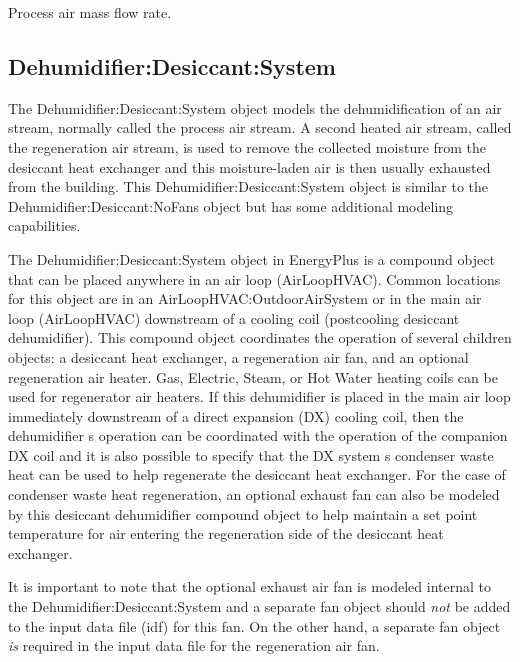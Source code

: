Process air mass flow rate.

\subsection{Dehumidifier:Desiccant:System}\label{dehumidifierdesiccantsystem}

The Dehumidifier:Desiccant:System object models the dehumidification of an air stream, normally called the process air stream. A second heated air stream, called the regeneration air stream, is used to remove the collected moisture from the desiccant heat exchanger and this moisture-laden air is then usually exhausted from the building. This Dehumidifier:Desiccant:System object is similar to the Dehumidifier:Desiccant:NoFans object but has some additional modeling capabilities.

The Dehumidifier:Desiccant:System object in EnergyPlus is a compound object that can be placed anywhere in an air loop (AirLoopHVAC). Common locations for this object are in an AirLoopHVAC:OutdoorAirSystem or in the main air loop (AirLoopHVAC) downstream of a cooling coil (postcooling desiccant dehumidifier). This compound object coordinates the operation of several children objects: a desiccant heat exchanger, a regeneration air fan, and an optional regeneration air heater. Gas, Electric, Steam, or Hot Water heating coils can be used for regenerator air heaters. If this dehumidifier is placed in the main air loop immediately downstream of a direct expansion (DX) cooling coil, then the dehumidifier s operation can be coordinated with the operation of the companion DX coil and it is also possible to specify that the DX system s condenser waste heat can be used to help regenerate the desiccant heat exchanger. For the case of condenser waste heat regeneration, an optional exhaust fan can also be modeled by this desiccant dehumidifier compound object to help maintain a set point temperature for air entering the regeneration side of the desiccant heat exchanger.

It is important to note that the optional exhaust air fan is modeled internal to the Dehumidifier:Desiccant:System and a separate fan object should \emph{not} be added to the input data file (idf) for this fan. On the other hand, a separate fan object \emph{is} required in the input data file for the regeneration air fan.

